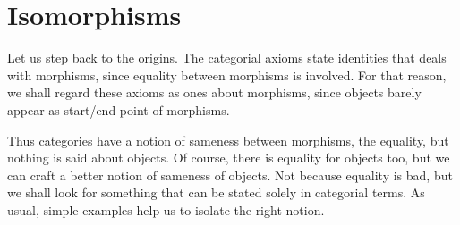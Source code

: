 
\section{Isomorphisms}


Let us step back to the origins. The categorial axioms state identities that deals with morphisms, since equality between morphisms is involved. For that reason, we shall regard these axioms as ones about morphisms, since objects barely appear as start/end point of morphisms.

Thus categories have a notion of sameness between morphisms, the equality, but nothing is said about objects. Of course, there is equality for objects too, but we can craft a better notion of sameness of objects. Not because equality is bad, but we shall look for something that can be stated solely in categorial terms. As usual, simple examples help us to isolate the right notion.

%

